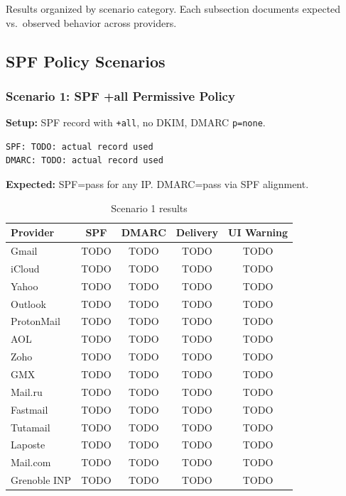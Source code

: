 \documentclass[11pt,a4paper]{article}
\begin{document}
Results organized by scenario category. Each subsection documents expected vs.\ observed behavior across providers.

\subsection{SPF Policy Scenarios}

\subsubsection{Scenario 1: SPF +all Permissive Policy}

\textbf{Setup:} SPF record with \texttt{+all}, no DKIM, DMARC \texttt{p=none}.

\begin{lstlisting}
SPF: TODO: actual record used
DMARC: TODO: actual record used
\end{lstlisting}

\textbf{Expected:} SPF=pass for any IP. DMARC=pass via SPF alignment.

\begin{table}[h]
\centering
\small
\begin{tabular}{lcccc}
\toprule
\textbf{Provider} & \textbf{SPF} & \textbf{DMARC} & \textbf{Delivery} & \textbf{UI Warning} \\
\midrule
Gmail & TODO & TODO & TODO & TODO \\
iCloud & TODO & TODO & TODO & TODO \\
Yahoo & TODO & TODO & TODO & TODO \\
Outlook & TODO & TODO & TODO & TODO \\
ProtonMail & TODO & TODO & TODO & TODO \\
AOL & TODO & TODO & TODO & TODO \\
Zoho & TODO & TODO & TODO & TODO \\
GMX & TODO & TODO & TODO & TODO \\
Mail.ru & TODO & TODO & TODO & TODO \\
Fastmail & TODO & TODO & TODO & TODO \\
Tutamail & TODO & TODO & TODO & TODO \\
Laposte & TODO & TODO & TODO & TODO \\
Mail.com & TODO & TODO & TODO & TODO \\
Grenoble INP & TODO & TODO & TODO & TODO \\
\bottomrule
\end{tabular}
\caption{Scenario 1 results}
\end{table}
\end{document}

